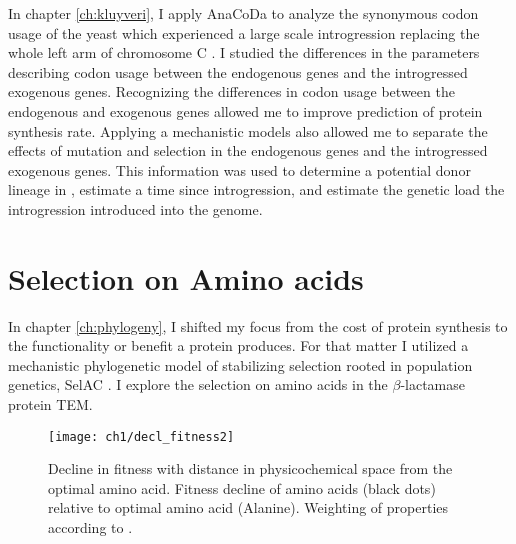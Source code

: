 In chapter \ref{ch:kluyveri}, I apply AnaCoDa to analyze the synonymous codon usage of the yeast \kluyveri which experienced a large scale introgression replacing the whole left arm of chromosome C \citep{friedrich2015}.
I studied the differences in the parameters describing codon usage between the endogenous \kluyveri genes and the introgressed exogenous genes.
Recognizing the differences in codon usage between the endogenous and exogenous genes allowed me to improve prediction of protein synthesis rate.
Applying a mechanistic models also allowed me to separate the effects of mutation and selection in the endogenous \kluyveri genes and the introgressed exogenous genes.
This information was used to determine a potential donor lineage in \gossypii, estimate a time since introgression, and estimate the genetic load the introgression introduced into the \kluyveri genome.

\section{Selection on Amino acids}

In chapter \ref{ch:phylogeny}, I shifted my focus from the cost of protein synthesis to the functionality or benefit a protein produces.
For that matter I utilized a mechanistic phylogenetic model of stabilizing selection rooted in population genetics, SelAC \cite{beaulieu2018}.
I explore the selection on amino acids in the $\beta$-lactamase protein TEM.
 
\begin{figure}[H]
     \centering
	\texttt{[image: ch1/decl\_fitness2]}
	\caption{Decline in fitness with distance in physicochemical space from the optimal amino acid. 
	Fitness decline of amino acids (black dots) relative to optimal amino acid (Alanine). Weighting of properties according to \citet{grantham1974}.}
	\label{fig:decl_fit}
\end{figure}








